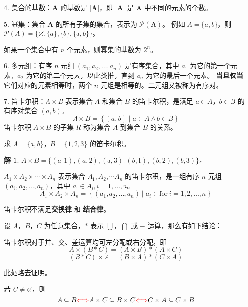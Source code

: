 \documentclass[normal,cyan]{elegantnote}
\newtheorem{solve}{解}
\begin{document}
4. 集合的基数：$\mathbf{A}$ 的基数是 $|\mathbf{A}|$，即 $|\mathbf{A}|$ 是 $\mathbf{A}$ 中不同的元素的个数。

5. 幂集：集合 $\mathbf{A}$ 的所有子集的集合，表示为 $\mathcal{P}(\mathbf{A})$。
例如 $A = \{a, b\}$，则 $\mathcal{P}(A) = \{\varnothing, \{a\}, \{b\}, \{a, b\}\}$。
\begin{note}
    如果一个集合中有 $n$ 个元素，则幂集的基数为 $2^n$。
\end{note}

6. 多元组：有序 $n$ 元组 $\left(a_1, a_2, \dots, a_n\right)$ 是有序集合，其中 $a_1$ 为它的第一个元素，$a_2$ 为它的第二个元素，以此类推，直到 $a_n$ 为它的最后一个元素。
\textbf{当且仅当}它们对应的元素相等时，两个 $n$ 元组是相等的。二元组又被称为有序对。

7. 笛卡尔积：$A \times B$ 表示集合 $A$ 和集合 $B$ 的笛卡尔积，是满足 $a \in A$，$b \in B$ 的有序对集合 $(a, b)$。
$$A \times B = \left\{\left(a, b\right)\mid a \in A \wedge b \in B\right\}$$
笛卡尔积 $A \times B$ 的子集 $R$ 称为集合 $A$ 到集合 $B$ 的关系。
\begin{example}
    求 $A = \{a, b\}$，$B = \{1, 2, 3\}$ 的笛卡尔积。
\end{example}
\begin{solve}
    $A \times B=\{(a, 1),(a, 2),(a, 3),(b, 1),(b, 2),(b, 3)\}$。
\end{solve}

$A_1 \times A_2 \times \cdots \times A_n$ 表示集合 $A_1, A_2, \cdots A_n$ 的笛卡尔积，是一组有序 $n$ 元组 $(a_1, a_2, \dots, a_n)$，其中 $a_i \in A_i, i = 1, \dots, n$。
$$A_1 \times A_2 \times A_n = \left\{\left(a_1, a_2, \dots, a_n\right)\mid a_i \in \text{for}\ i = 1, 2, \dots, n\right\}$$
\begin{remark}
    笛卡尔积不满足\textbf{交换律} 和 \textbf{结合律}。
\end{remark}
\begin{theorem}
    设 $A$，$B$，$C$ 为任意集合，$*$ 表示 $\bigcup$，$\bigcap$ 或 $-$ 运算，那么有如下结论：

    笛卡尔积对于并、交、差运算均可左分配或右分配。即：
    $$A \times (B * C) = (A \times B) * (A \times C)$$ $$(B * C) \times A = (B \times A) * (C \times A)$$
\end{theorem}
此处略去证明。
\begin{theorem}
    若 $C \neq \varnothing$，则 $$A \subseteq B {\color{red} \Longleftrightarrow} A \times C \subseteq B \times C {\color{red}\Longleftrightarrow} C \times A \subseteq C \times B$$
\end{theorem}
\end{document}
